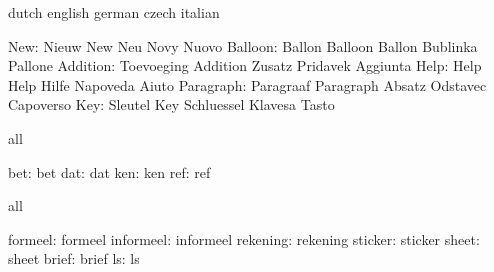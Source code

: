 \stopvariables


\startvariables            dutch                     english
                           german                    czech
                           italian

                      New: Nieuw                     New
                           Neu                       Novy
                           Nuovo
                  Balloon: Ballon                    Balloon
                           Ballon                    Bublinka
                           Pallone
                 Addition: Toevoeging                Addition
                           Zusatz                    Pridavek
                           Aggiunta
                     Help: Help                      Help
                           Hilfe                     Napoveda
                           Aiuto
                Paragraph: Paragraaf                 Paragraph
                           Absatz                    Odstavec
                           Capoverso
                      Key: Sleutel                   Key
                           Schluessel                Klavesa
                           Tasto
\stopvariables




\startconstants            all

                      bet: bet
                      dat: dat
                      ken: ken
                      ref: ref

\stopconstants

\startvariables            all

                  formeel: formeel
                informeel: informeel
                 rekening: rekening
                  sticker: sticker
                    sheet: sheet
                    brief: brief
                       ls: ls

\stopvariables


\stoplogginginterface

\endinput
